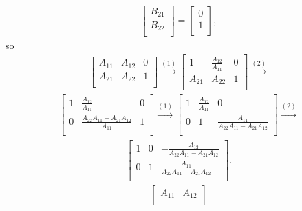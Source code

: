 \documentclass[12pt]{article}
\begin{document}
\begin{enumerate}
\begin{align*}
\begin{bmatrix}
        B_{21}\\
        B_{22}\\
      \end{bmatrix}
      =
      \begin{bmatrix}
        0\\
        1\\
      \end{bmatrix},
    \end{align*}
    so
    \begin{align*}
      \begin{bmatrix}
        A_{11} & A_{12} & 0\\
        A_{21} & A_{22} & 1\\
      \end{bmatrix}
      \xrightarrow{(1)}
      \begin{bmatrix}
        1 & \frac{A_{12}}{A_{11}} & 0\\
        A_{21} & A_{22} & 1\\
      \end{bmatrix}
      \xrightarrow{(2)}
    \end{align*}
    \begin{align*}
      \begin{bmatrix}
        1 & \frac{A_{12}}{A_{11}} & 0\\
        0 & \frac{A_{22}A_{11} - A_{21}A_{12}}{A_{11}} & 1\\
      \end{bmatrix}
      \xrightarrow{(1)}
      \begin{bmatrix}
        1 & \frac{A_{12}}{A_{11}} & 0\\
        0 & 1 & \frac{A_{11}}{A_{22}A_{11} - A_{21}A_{12}}\\
      \end{bmatrix}
      \xrightarrow{(2)}
    \end{align*}
    \begin{align*}
      \begin{bmatrix}
        1 &
          0 &
          -\frac{A_{12}}{A_{22}A_{11} - A_{21}A_{12}}\\
        0 &
          1 &
          \frac{A_{11}}{A_{22}A_{11} - A_{21}A_{12}}\\
      \end{bmatrix}.
    \end{align*}
    \begin{align*}
      \begin{bmatrix}
        A_{11} & A_{12}\\

\end{bmatrix}
\end{align*}
\end{enumerate}
\end{document}

